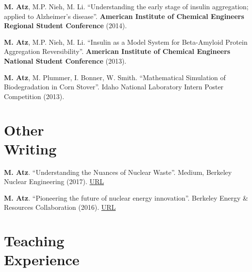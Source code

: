 \documentclass[margin,line]{resume}
\begin{document}
\begin{resume}
\begin{bibenum}
    \item \textbf{M. Atz}, M.P. Nieh, M. Li. ``Understanding the early stage of insulin aggregation; applied to Alzheimer’s disease''. \textbf{American Institute of Chemical Engineers Regional Student Conference} (2014).

    \item \textbf{M. Atz}, M.P. Nieh, M. Li. ``Insulin as a Model System for Beta-Amyloid Protein Aggregation Reversibility''. \textbf{American Institute of Chemical Engineers National Student Conference} (2013).

    \item \textbf{M. Atz}, M. Plummer, I. Bonner, W. Smith. ``Mathematical Simulation of Biodegradation in Corn Stover''. Idaho National Laboratory Intern Poster Competition (2013).

\end{bibenum}
\vspace{0mm}


\section{\mysidestyle Other\\Writing}
\begin{bibenum}

    \item \textbf{M. Atz}. ``Understanding the Nuances of Nuclear Waste''. Medium, Berkeley Nuclear Engineering (2017). \href{https://medium.com/berkeley-nuclear-engineering/understanding-the-nuances-of-nuclear-waste-5c123ba4211f}{URL}
    
    \item \textbf{M. Atz}. ``Pioneering the future of nuclear energy innovation''. Berkeley Energy \& Resources Collaboration (2016). \href{http://berc.berkeley.edu/pioneering-future-nuclear-energy-innovation/}{URL}

\end{bibenum}


\section{\mysidestyle Teaching\\Experience}
    

\end{resume}
\end{document}
